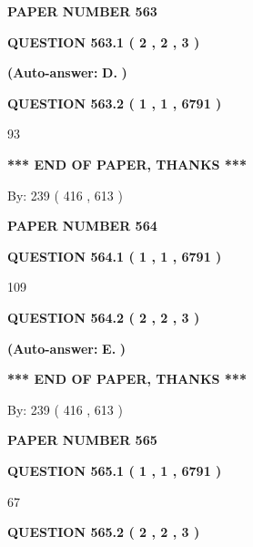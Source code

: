 \documentclass[12pt]{article}
\begin{document}
   
\newpage 
\setcounter{page}{ 
   563001 } 
   
   
 {\textbf{ \Large{ PAPER NUMBER  563  }}}
   
   
   
   
  
  
{\textbf{\large{QUESTION
563.1 
 ( 2 , 2 , 3 )
}}}
 
 
{\textbf{(Auto-answer:}}
{\textbf{\large{
D.}}}
{\textbf{)}}
 
 
  
  
{\textbf{\large{QUESTION
563.2 
 ( 1 , 1 , 6791 )
}}}

93
   
   
   
   
\vspace{1.0in} 
{\textbf{\large{ *** END OF PAPER, THANKS *** }}} 
   
   
\hspace{1.0in} By: 
 239 ( 416 ,  613 )
   
   
   
   
\newpage 
\setcounter{page}{ 
   564001 } 
   
   
 {\textbf{ \Large{ PAPER NUMBER  564  }}}
   
   
   
   
  
  
{\textbf{\large{QUESTION
564.1 
 ( 1 , 1 , 6791 )
}}}

109
  
  
{\textbf{\large{QUESTION
564.2 
 ( 2 , 2 , 3 )
}}}
 
 
{\textbf{(Auto-answer:}}
{\textbf{\large{
E.}}}
{\textbf{)}}
 
 
   
   
   
   
\vspace{1.0in} 
{\textbf{\large{ *** END OF PAPER, THANKS *** }}} 
   
   
\hspace{1.0in} By: 
 239 ( 416 ,  613 )
   
   
   
   
\newpage 
\setcounter{page}{ 
   565001 } 
   
   
 {\textbf{ \Large{ PAPER NUMBER  565  }}}
   
   
   
   
  
  
{\textbf{\large{QUESTION
565.1 
 ( 1 , 1 , 6791 )
}}}

67
  
  
{\textbf{\large{QUESTION
565.2 
 ( 2 , 2 , 3 )
}}}
 
\end{document}
